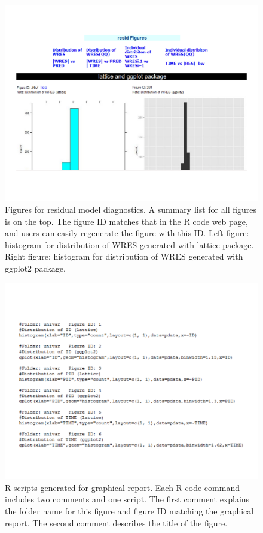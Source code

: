 \documentclass[a4paper]{article}
\begin{document}
\begin{figure}[h!tb] \centering
\includegraphics[scale=0.5]{c2_s2_3fig.pdf}
\caption{Figures for residual model diagnostics. A summary list for all figures is on the top. The figure ID matches that in the R code web page, and users can
easily regenerate the figure with this ID. Left figure: histogram for distribution of WRES generated with lattice package. Right figure: histogram for distribution of
WRES generated with ggplot2 package.}
\label{c2_s2_3fig}
\end{figure}

\begin{figure}[h!tb] \centering
\includegraphics[scale=0.5]{c2_s2_5code.pdf}
\caption{R scripts generated for graphical report. Each R code command includes two comments and one
script. The first comment explains the folder name for this figure
and figure ID matching the graphical report. The second
comment describes the title of the figure.} 
\label{c2_s2_5code}
\end{figure}
\end{document}
